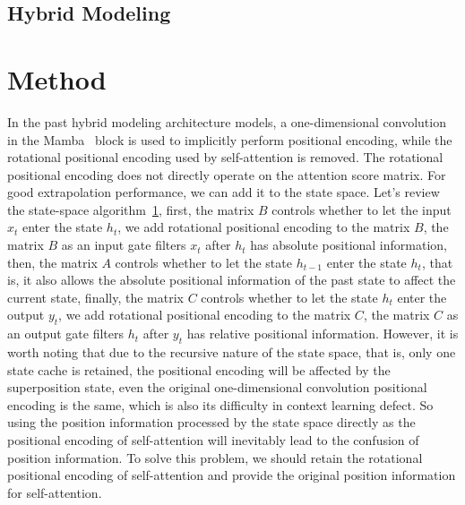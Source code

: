 \documentclass{article}
\theoremstyle{plain}
\theoremstyle{definition}
\theoremstyle{remark}
\begin{document}
\subsection{Hybrid Modeling}





\section{Method}

In the past hybrid modeling architecture models, a one-dimensional convolution in the Mamba~\cite{gu2023mamba} block is used to implicitly perform positional encoding, while the rotational positional encoding used by self-attention is removed. The rotational positional encoding does not directly operate on the attention score matrix. For good extrapolation performance, we can add it to the state space. Let's review the state-space algorithm~\ref{}, first, the matrix $B$ controls whether to let the input $x_t$ enter the state $h_t$, we add rotational positional encoding to the matrix $B$, the matrix $B$ as an input gate filters $x_t$ after $h_t$ has absolute positional information, then, the matrix $A$ controls whether to let the state $h_{t-1}$ enter the state $h_t$, that is, it also allows the absolute positional information of the past state to affect the current state, finally, the matrix $C$ controls whether to let the state $h_t$ enter the output $y_t$, we add rotational positional encoding to the matrix $C$, the matrix $C$ as an output gate filters $h_t$ after $y_t$ has relative positional information. However, it is worth noting that due to the recursive nature of the state space, that is, only one state cache is retained, the positional encoding will be affected by the superposition state, even the original one-dimensional convolution positional encoding is the same, which is also its difficulty in context learning defect. So using the position information processed by the state space directly as the positional encoding of self-attention will inevitably lead to the confusion of position information. To solve this problem, we should retain the rotational positional encoding of self-attention and provide the original position information for self-attention.
\end{document}
